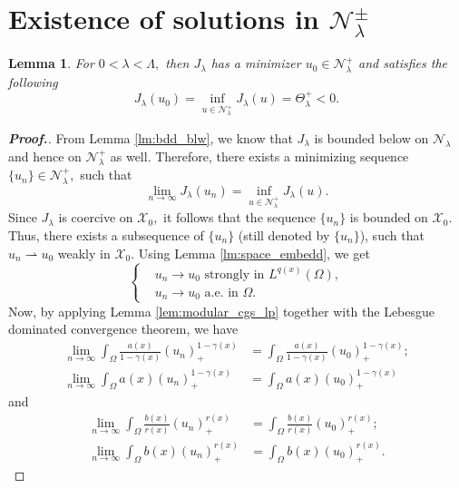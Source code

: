 \documentclass[11pt]{article}
\newtheorem{lemma}{Lemma}[section] %
\newcommand{\X}{\mathcal{X}_{0}}
\newcommand{\Nh}{\mathcal{N}_\la}
\newcommand{\Th} {\Theta}
\newcommand{\ga} {\gamma}
\newcommand{\om} {\Omega}
\newcommand{\la} {\lambda}
\newcommand{\La} {\Lambda}
\newcommand{\ra} {\rightarrow}
\newcommand{\weak}{\rightharpoonup}
\begin{document}
\section{Existence of solutions in 
\texorpdfstring{$\Nh^{\pm}$}{Nehari Manifold}}\label{sec3}


\begin{lemma}\label{lm:min_pos}
    For $0<\la<\La,$
then $J_\la$
has a minimizer $u_0\in \Nh^+$
and satisfies the following
$$
    J_\la(u_0)=
 \inf_{u\in \mathcal{N}_\la^+}J_\la(u)=\Th_\la^+<0.
$$
\end{lemma}


\begin{proof}[\bf Proof.]
    From Lemma \ref{lm:bdd_blw}, we know that $J_\la$
is bounded below on $\Nh$
and hence on $\Nh^+$
as well.
Therefore, there exists a minimizing sequence $\{u_n\}\in\Nh^+,$
such that
    $$\lim_{n\to\infty} J_\la(u_n)=\inf_{u\in\Nh^+}J_\la(u).$$
    Since $J_\la$
is coercive on $\X,$
it follows that the sequence $\{u_n\}$
is bounded on $\X.$
Thus, there exists a subsequence of $\{u_n\}$
(still denoted by $\{u_n\}$), such that $u_n\weak u_0$
weakly in $\X.$
Using Lemma \ref{lm:space_embedd}, we get
\begin{equation*}
   \left\{
	\begin{aligned}
		&u_n\ra u_0 \text{ strongly in }L^{q(x)}(\om),\\
        &u_n\ra u_0 \text{ a.e. in } \om.
	\end{aligned}
    \right.
\end{equation*}
Now, by applying Lemma \ref{lem:modular_cgs_lp} 
together with the Lebesgue dominated convergence
 theorem, we have
\begin{equation}\label{eq7}
\left.
	\begin{aligned}
    \lim_{n\to\infty}
\int_\om 
\frac{a(x)}{1-\ga(x)}(u_n)_+^{1-\ga(x)}&=
\int_\om 
\frac{a(x)}{1-\ga(x)}(u_0)_+^{1-\ga(x)};\\
    \lim_{n\to\infty}
\int_\om a(x)(u_n)_+^{1-\ga(x)}&=
\int_\om a(x)(u_0)_+^{1-\ga(x)}
\end{aligned}
  \right.
  \end{equation}
and 
\begin{equation}\label{eq22}
\begin{aligned}
    \lim_{n\to\infty}
\int_\om 
\frac{b(x)}{r(x)}(u_n)_+^{r(x)}&=
\int_\om 
\frac{b(x)}{r(x)}(u_0)_+^{r(x)};\\
    \lim_{n\to\infty}
\int_\om b(x)(u_n)_+^{r(x)}&=
\int_\om b(x)(u_0)_+^{r(x)}.
\end{aligned}

\end{equation}
\end{proof}
\end{document}
